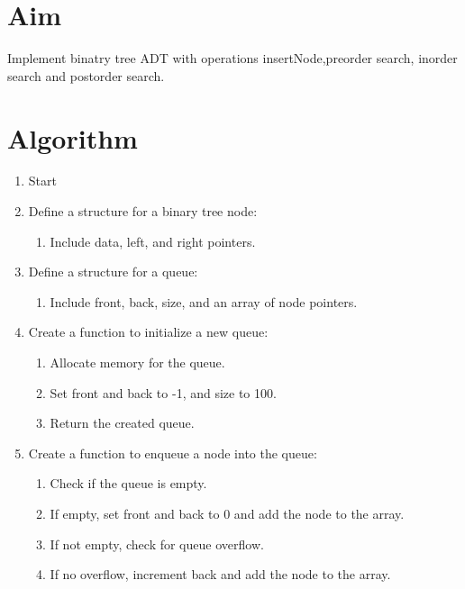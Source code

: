 
\section{Aim}
Implement binatry tree ADT with operations insertNode,preorder search, inorder search and postorder search.
\section{Algorithm}
 {\selectfont

  \begin{enumerate}[label=\arabic*.]
    \item Start

    \item Define a structure for a binary tree node:
          \begin{enumerate}[label=\arabic{enumi}.\arabic*.]
            \item Include data, left, and right pointers.
          \end{enumerate}

    \item Define a structure for a queue:
          \begin{enumerate}[label=\arabic{enumi}.\arabic*.]
            \item Include front, back, size, and an array of node pointers.
          \end{enumerate}

    \item Create a function to initialize a new queue:
          \begin{enumerate}[label=\arabic{enumi}.\arabic*.]
            \item Allocate memory for the queue.
            \item Set front and back to -1, and size to 100.
            \item Return the created queue.
          \end{enumerate}

    \item Create a function to enqueue a node into the queue:
          \begin{enumerate}[label=\arabic{enumi}.\arabic*.]
            \item Check if the queue is empty.
            \item If empty, set front and back to 0 and add the node to the array.
            \item If not empty, check for queue overflow.
            \item If no overflow, increment back and add the node to the array.
          \end{enumerate}


\end{enumerate}}
